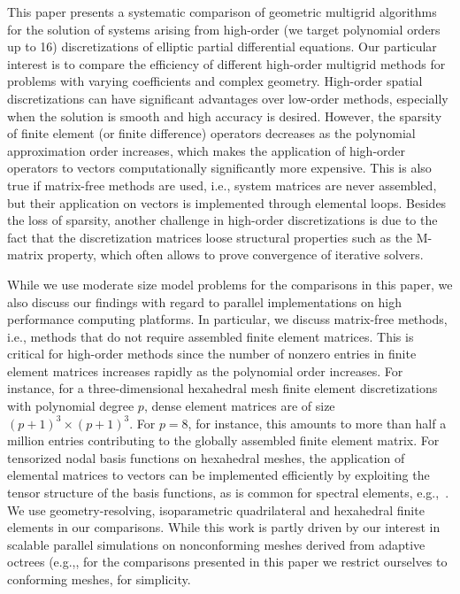 \documentclass[smallcondensed,final]{svjour3}     %
\begin{document}
This paper presents a systematic comparison of geometric multigrid
algorithms for the solution of systems arising from high-order (we
target polynomial orders up to 16) discretizations of elliptic partial
differential equations. Our particular interest is to compare the
efficiency of different high-order multigrid methods for problems with
varying coefficients and complex geometry.
High-order spatial discretizations can have significant advantages
over low-order methods, especially when the solution is smooth and
high accuracy is desired. However, the sparsity of finite element (or
finite difference) operators decreases as the polynomial approximation
order increases, which makes the application of high-order operators
to vectors computationally significantly more expensive. This is also
true if matrix-free methods are used, i.e., system matrices are never
assembled, but their application on vectors is implemented through
elemental loops.  Besides the loss of sparsity, another challenge in
high-order discretizations is due to the fact that the discretization
matrices loose structural properties such as the M-matrix property,
which often allows to prove convergence of iterative solvers.

While we use moderate size model problems for the comparisons in this
paper, we also discuss our findings with regard to parallel
implementations on high performance computing platforms.  In
particular, we discuss matrix-free methods, i.e., methods that do not
require assembled finite element matrices. This is critical for
high-order methods since the number of nonzero entries in finite
element matrices increases rapidly as the polynomial order
increases. For instance, for a three-dimensional hexahedral mesh
finite element discretizations with polynomial degree $p$, dense
element matrices are of size $(p+1)^3\times (p+1)^3$. For $p=8$, for
instance, this amounts to more than half a million entries
contributing to the globally assembled finite element matrix.  For
tensorized nodal basis functions on hexahedral meshes, the application
of elemental matrices to vectors can be implemented efficiently by
exploiting the tensor structure of the basis functions, as is common
for spectral elements, e.g.,~\cite{DevilleFischerMund02}. We use
geometry-resolving, isoparametric quadrilateral and hexahedral finite
elements in our comparisons. While this work is partly driven by our
interest in scalable parallel simulations on nonconforming meshes
derived from adaptive octrees (e.g.,\cite{SundarBirosBursteddeEtAl12,
  SampathBiros10, BursteddeGhattasGurnisEtAl10}, for the comparisons
presented in this paper we restrict ourselves to conforming meshes,
for simplicity.
\end{document}
